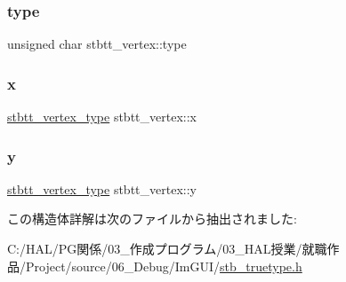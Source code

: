 \mbox{\label{structstbtt__vertex_aa325b3707b88e7e104c0de46bb2bf395}} 
\subsubsection{\texorpdfstring{type}{type}}
{\footnotesize\ttfamily unsigned char stbtt\+\_\+vertex\+::type}

\mbox{\label{structstbtt__vertex_a81773edbe760d0e090561a3c1e86c919}} 
\subsubsection{\texorpdfstring{x}{x}}
{\footnotesize\ttfamily \mbox{\hyperlink{stb__truetype_8h_ab8fd8e5e0b82b0f7da54532035e47b22}{stbtt\+\_\+vertex\+\_\+type}} stbtt\+\_\+vertex\+::x}

\mbox{\label{structstbtt__vertex_a9052065ca544b63d537325b246928cfc}} 
\subsubsection{\texorpdfstring{y}{y}}
{\footnotesize\ttfamily \mbox{\hyperlink{stb__truetype_8h_ab8fd8e5e0b82b0f7da54532035e47b22}{stbtt\+\_\+vertex\+\_\+type}} stbtt\+\_\+vertex\+::y}



この構造体詳解は次のファイルから抽出されました\+:\begin{DoxyCompactItemize}
\item 
C\+:/\+H\+A\+L/\+P\+G関係/03\+\_\+作成プログラム/03\+\_\+\+H\+A\+L授業/就職作品/\+Project/source/06\+\_\+\+Debug/\+Im\+G\+U\+I/\mbox{\hyperlink{stb__truetype_8h}{stb\+\_\+truetype.\+h}}\end{DoxyCompactItemize}
